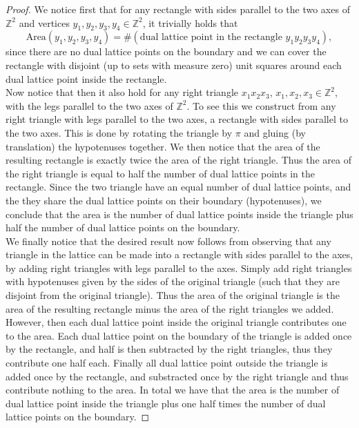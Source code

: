\documentclass[a4paper,11pt]{article}
\newcommand{\Z}{\mathbb{Z}}
\newcommand{\Area}{\text{Area}}
\numberwithin{equation}{section}
\begin{document}
\begin{proof}
	We notice first that for any rectangle with sides parallel to the two axes of $ \Z^2 $ and vertices $ y_1,y_2,y_3,y_4\in \Z^2 $, it trivially holds that \begin{equation}
	\Area(y_1,y_2,y_3,y_4)=\#(\text{dual lattice point in the rectangle }y_1y_2y_3y_4),
	\end{equation}
	since there are no dual lattice points on the boundary and we can cover the rectangle with disjoint (up to sets with measure zero) unit squares around each dual lattice point inside the rectangle.\\
	Now notice that then it also hold for any right triangle $ x_1x_2x_3 $, $ x_1,x_2,x_3\in\Z^2 $,  with the legs parallel to the two axes of $ \Z^2 $. To see this we construct from any right triangle with legs parallel to the two axes, a rectangle with sides parallel to the two axes. This is done by rotating the triangle by $ \pi $ and gluing (by translation) the hypotenuses together. We then notice that the area of the resulting rectangle is exactly twice the area of the right triangle. Thus the area of the right triangle is equal to half the number of dual lattice points in the rectangle. Since the two triangle have an equal number of dual lattice points, and the they share the dual lattice points on their boundary (hypotenuses), we conclude that the area is the number of dual lattice points inside the triangle plus half the number of dual lattice points on the boundary.\\
	We finally notice that the desired result now follows from observing that any triangle in the lattice can be made into a rectangle with sides parallel to the axes, by adding right triangles with legs parallel to the axes. Simply add right triangles with hypotenuses given by the sides of the original triangle (such that they are disjoint from the original triangle). Thus the area of the original triangle is the area of the resulting rectangle minus the area of the right triangles we added. However, then each dual lattice point inside the original triangle contributes one to the area. Each dual lattice point on the boundary of the triangle is added once by the rectangle, and half is then subtracted by the right triangles, thus they contribute one half each. Finally all dual lattice point outside the triangle is added once by the rectangle, and substracted once by the right triangle and thus contribute nothing to the area. In total we have that the area is the number of dual lattice point inside the triangle plus one half times the number of dual lattice points on the boundary. 
\end{proof}
\end{document}
